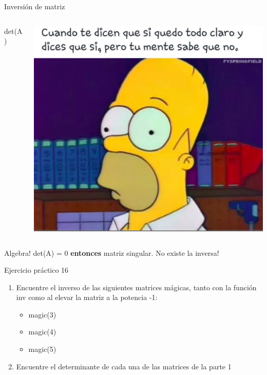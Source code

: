 \documentclass{bredelebeamer}
\begin{document}
\begin{frame}{Inversión de matriz}
\begin{columns}
\begin{column}{0.5\textwidth}
\begin{center}
\LARGE det(A)
\end{center}
\end{column}
\begin{column}{0.5\textwidth}
\begin{center}
\includegraphics[scale=0.25]{images/img40.png}
\end{center}
\end{column}
\end{columns}
\begin{alertblock}{Algebra!}
det(A) = 0 \textbf{entonces} matriz singular. No existe la inversa!
\end{alertblock}
\end{frame}

\begin{frame}{Ejercicio práctico 16}
\begin{enumerate}
\item Encuentre el inverso de las siguientes matrices mágicas, tanto con la función inv como al elevar la matriz a la potencia -1:
\begin{itemize}
\item magic(3)
\item magic(4)
\item magic(5)
\end{itemize}
\item Encuentre el determinante de cada una de las matrices de la parte 1
\end{enumerate}
\end{frame}
\end{document}
